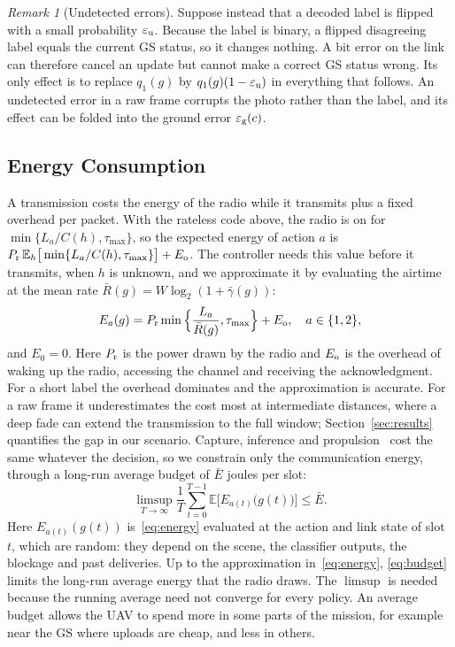 \documentclass[5p,twocolumn]{elsarticle}
\theoremstyle{remark}
\newtheorem{remark}{Remark}
\newcommand{\E}{\mathbb{E}}
\newcommand{\ee}{\varepsilon}
\begin{document}
\begin{remark}[Undetected errors]\label{rem:flip}
Suppose instead that a decoded label is flipped with a small probability $\ee_{\rm u}$. Because the label is binary, a flipped disagreeing label equals the current GS status, so it changes nothing. A bit error on the link can therefore cancel an update but cannot make a correct GS status wrong. Its only effect is to replace $q_1(g)$ by $q_1(g)(1-\ee_{\rm u})$ in everything that follows. An undetected error in a raw frame corrupts the photo rather than the label, and its effect can be folded into the ground error $\ee_{\rm g}(c)$.
\end{remark}

\subsection{Energy Consumption}
A transmission costs the energy of the radio while it transmits plus a fixed overhead per packet. With the rateless code above, the radio is on for $\min\{L_a/C(h),\tau_{\max}\}$, so the expected energy of action $a$ is $P_{\rm r}\,\E_h\big[\min\{L_a/C(h),\tau_{\max}\}\big]+E_{\rm o}$. The controller needs this value before it transmits, when $h$ is unknown, and we approximate it by evaluating the airtime at the mean rate $\bar R(g)=W\log_2(1+\bar\gamma(g))$:
\begin{equation}\label{eq:energy}
E_a(g)=P_{\rm r}\min\Big\{\frac{L_a}{\bar R(g)},\tau_{\max}\Big\}+E_{\rm o},\quad a\in\{1,2\},
\end{equation}
and $E_0=0$. Here $P_{\rm r}$ is the power drawn by the radio and $E_{\rm o}$ is the overhead of waking up the radio, accessing the channel and receiving the acknowledgment. For a short label the overhead dominates and the approximation is accurate. For a raw frame it underestimates the cost most at intermediate distances, where a deep fade can extend the transmission to the full window; Section~\ref{sec:results} quantifies the gap in our scenario. Capture, inference and propulsion~\cite{zeng2019rotary} cost the same whatever the decision, so we constrain only the communication energy, through a long-run average budget of $\bar E$ joules per slot:
\begin{equation}\label{eq:budget}
\limsup_{T\to\infty}\frac1T\sum_{t=0}^{T-1}\E\Big[E_{a(t)}\big(g(t)\big)\Big]\le\bar E.
\end{equation}
Here $E_{a(t)}(g(t))$ is~\eqref{eq:energy} evaluated at the action and link state of slot $t$, which are random: they depend on the scene, the classifier outputs, the blockage and past deliveries. Up to the approximation in~\eqref{eq:energy}, \eqref{eq:budget} limits the long-run average energy that the radio draws. The $\limsup$ is needed because the running average need not converge for every policy. An average budget allows the UAV to spend more in some parts of the mission, for example near the GS where uploads are cheap, and less in others.
\end{document}
